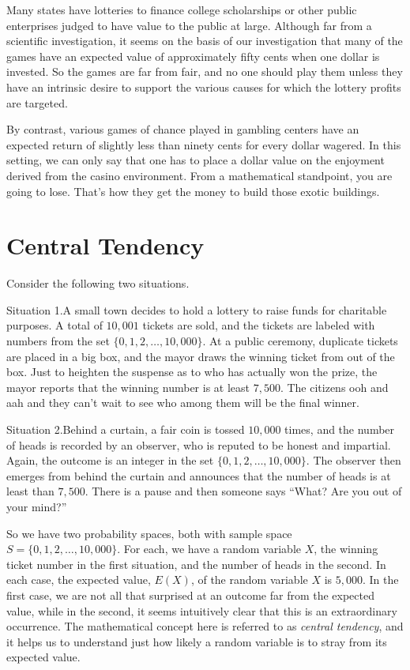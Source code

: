 \begin{example}
Many states have lotteries to finance college scholarships
or other public enterprises judged to have value to the public
at large.  Although far from a scientific investigation, it seems on
the basis of our investigation that many of the games have an 
expected value of approximately fifty cents when one
dollar is invested.  So the games are far from fair, and no
one should play them unless they have an intrinsic desire
to support the various causes for which the lottery profits
are targeted.

By contrast, various games of chance played in gambling
centers have an expected return of slightly less than ninety
cents for every dollar wagered.  In this setting, we can
only say that one has to place a dollar value on the 
enjoyment derived from the casino environment.  From a mathematical
standpoint, you are going to lose.  That's how they get the money
to build those exotic buildings.
\end{example}

\section{Central Tendency}

Consider the following two situations.

Situation 1.\quad A small town decides to hold a lottery to raise funds for
charitable purposes.  A total of $10,001$ tickets are sold, and the
tickets are labeled with numbers from the set $\{0,1,2,\dots,10,000\}$. 
At a public ceremony, duplicate tickets are placed in a big box, and
the mayor draws the winning ticket from out of the box.  Just to heighten 
the suspense as to who has actually won the prize, the mayor reports that 
the winning number is at least $7,500$.  The citizens ooh and aah and they
can't wait to see who among them will be the final winner.

Situation 2.\quad Behind a curtain, a fair coin is tossed $10,000$ times, 
and the number of heads is recorded by an observer, who is reputed to
be honest and impartial.   Again, the outcome is an integer in the 
set $\{0,1,2,\dots,10,000\}$.  The observer then emerges from behind 
the curtain and announces that the number of heads is at least than $7,500$.  
There is a pause and then someone says ``What?  Are you out of your mind?''

So we have two probability spaces, both with sample space
$S=\{0,1,2,\dots,10,000\}$.  For each, we have a random variable $X$,
the winning ticket number in the first situation, and the number of
heads in the second.  In each case, the expected value, $E(X)$, of the
random variable $X$ is $5,000$.  In the first case, we are not all
that surprised at an outcome far from the expected value, while in the
second, it seems intuitively clear that this is an extraordinary
occurrence.  The mathematical concept here is referred to as
\textit{central tendency}, and it helps us to understand just how
likely a random variable is to stray from its expected value.

